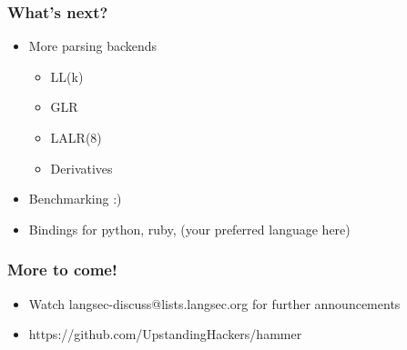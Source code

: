 \documentclass{beamer}
\begin{document}
\begin{frame}[fragile]
	\frametitle{What's next?}
	\begin{itemize}
		\item More parsing backends
		\begin{itemize}
			\item LL(k)
			\item GLR
			\item LALR(8)
			\item Derivatives
		\end{itemize}
		\item Benchmarking :)
		\item Bindings for python, ruby, (your preferred language here)
	\end{itemize}
\end{frame}

\begin{frame}[fragile]
	\frametitle{More to come!}
	\begin{itemize}
		\item Watch langsec-discuss@lists.langsec.org for further announcements
		\item https://github.com/UpstandingHackers/hammer
	\end{itemize}
\end{frame}
\end{document}
